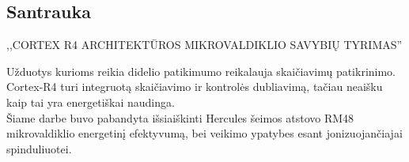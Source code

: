 \documentclass[a4paper, 12pt]{article} %
\newcommand{\studentas}{Mindaugas Kurmauskas} %
\newcommand{\pavadinimas}{Cortex R4 architekt\={u}ros mikrovaldiklio savybi\k{u} tyrimas} %
\begin{document}
\begin{onehalfspacing}

\newpage

\section*{Santrauka}




\begin{center}


\MakeUppercase{,,\pavadinimas''}\\

\end{center}

U\v{z}duotys kurioms reikia didelio patikimumo reikalauja skai\v{c}iavim\k{u} patikrinimo. Cortex-R4 turi integruot\k{a} skai\v{c}iavimo ir kontrol\.es dubliavim\k{a}, ta\v{c}iau neai\v{s}ku kaip tai yra energeti\v{s}kai naudinga. \\
\indent
\v{S}iame darbe buvo pabandyta i\v{s}siai\v{s}kinti Hercules \v{s}eimos atstovo RM48 mikrovaldiklio energetin\k{i} efektyvum\k{a}, bei veikimo ypatybes esant jonizuojan\v{c}iajai spinduliuotei.












\end{onehalfspacing}
\end{document}
